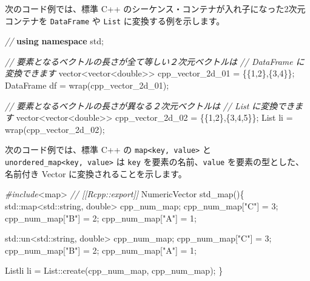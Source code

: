 \documentclass[]{book}
\newenvironment{Shaded}{\begin{snugshade}}{\end{snugshade}}
\newcommand{\BuiltInTok}[1]{#1}
\newcommand{\CommentTok}[1]{\textcolor[rgb]{0.56,0.35,0.01}{\textit{#1}}}
\newcommand{\DataTypeTok}[1]{\textcolor[rgb]{0.13,0.29,0.53}{#1}}
\newcommand{\DecValTok}[1]{\textcolor[rgb]{0.00,0.00,0.81}{#1}}
\newcommand{\ImportTok}[1]{#1}
\newcommand{\KeywordTok}[1]{\textcolor[rgb]{0.13,0.29,0.53}{\textbf{#1}}}
\newcommand{\NormalTok}[1]{#1}
\newcommand{\PreprocessorTok}[1]{\textcolor[rgb]{0.56,0.35,0.01}{\textit{#1}}}
\newcommand{\StringTok}[1]{\textcolor[rgb]{0.31,0.60,0.02}{#1}}
\begin{document}
次のコード例では、標準 C++ のシーケンス・コンテナが入れ子になった2次元コンテナを \texttt{DataFrame} や \texttt{List} に変換する例を示します。

\begin{Shaded}
\begin{Highlighting}[]
\CommentTok{//}
\KeywordTok{using} \KeywordTok{namespace}\NormalTok{ std;}

\CommentTok{// 要素となるベクトルの長さが全て等しい２次元ベクトルは}
\CommentTok{// DataFrame に変換できます}
\NormalTok{vector<vector<}\DataTypeTok{double}\NormalTok{>> cpp_vector_2d_01 = \{\{}\DecValTok{1}\NormalTok{,}\DecValTok{2}\NormalTok{\},\{}\DecValTok{3}\NormalTok{,}\DecValTok{4}\NormalTok{\}\};}
\NormalTok{DataFrame df = wrap(cpp_vector_2d_01);}

\CommentTok{// 要素となるベクトルの長さが異なる２次元ベクトルは}
\CommentTok{// List に変換できます}
\NormalTok{vector<vector<}\DataTypeTok{double}\NormalTok{>> cpp_vector_2d_02 = \{\{}\DecValTok{1}\NormalTok{,}\DecValTok{2}\NormalTok{\},\{}\DecValTok{3}\NormalTok{,}\DecValTok{4}\NormalTok{,}\DecValTok{5}\NormalTok{\}\};}
\NormalTok{List li = wrap(cpp_vector_2d_02);}
\end{Highlighting}
\end{Shaded}

次のコード例では、標準 C++ の \texttt{map\textless{}key,\ value\textgreater{}} と \texttt{unordered\_map\textless{}key,\ value\textgreater{}} は \texttt{key} を要素の名前、\texttt{value} を要素の型とした、名前付き Vector に変換されることを示します。

\begin{Shaded}
\begin{Highlighting}[]
\PreprocessorTok{#include}\ImportTok{<map>}
\CommentTok{// [[Rcpp::export]]}
\NormalTok{NumericVector std_map()\{}
    \BuiltInTok{std::}\NormalTok{map<}\BuiltInTok{std::}\NormalTok{string, }\DataTypeTok{double}\NormalTok{> cpp_num_map;}
\NormalTok{    cpp_num_map[}\StringTok{"C"}\NormalTok{] = }\DecValTok{3}\NormalTok{;    }
\NormalTok{    cpp_num_map[}\StringTok{"B"}\NormalTok{] = }\DecValTok{2}\NormalTok{;}
\NormalTok{    cpp_num_map[}\StringTok{"A"}\NormalTok{] = }\DecValTok{1}\NormalTok{;}

    \BuiltInTok{std::}\NormalTok{un<}\BuiltInTok{std::}\NormalTok{string, }\DataTypeTok{double}\NormalTok{> cpp_num_map;}
\NormalTok{    cpp_num_map[}\StringTok{"C"}\NormalTok{] = }\DecValTok{3}\NormalTok{;    }
\NormalTok{    cpp_num_map[}\StringTok{"B"}\NormalTok{] = }\DecValTok{2}\NormalTok{;}
\NormalTok{    cpp_num_map[}\StringTok{"A"}\NormalTok{] = }\DecValTok{1}\NormalTok{;}

\NormalTok{    Listli li = List::create(cpp_num_map, cpp_num_map);}
\NormalTok{\}}
\end{Highlighting}
\end{Shaded}
\end{document}
